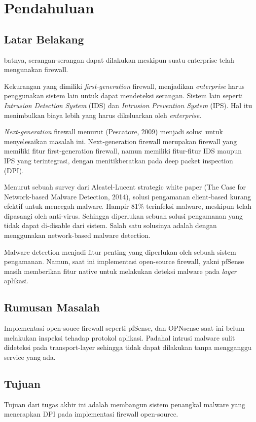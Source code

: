 \chapter{Pendahuluan}

\section{Latar Belakang}

batnya, serangan-serangan dapat dilakukan meskipun suatu enterprise telah mengunakan firewall.

Kekurangan yang dimiliki \textit{first-generation} firewall, menjadikan \textit{enterprise} harus penggunakan sistem lain untuk dapat mendeteksi serangan. Sistem lain seperti \textit{Intrusion Detection System} (IDS) dan \textit{Intrusion Prevention System} (IPS). Hal itu menimbulkan biaya lebih yang harus dikeluarkan oleh \textit{enterprise}.

\textit{Next-generation} firewall menurut (Pescatore, 2009) menjadi solusi untuk menyelesaikan masalah ini. Next-generation firewall merupakan firewall yang memiliki fitur first-generation firewall, namun memiliki fitur-fitur IDS maupun IPS yang terintegrasi, dengan menitikberatkan pada deep packet inspection (DPI).

Menurut sebuah survey dari Alcatel-Lucent strategic white paper (The Case for
Network-based Malware Detection, 2014), solusi pengamanan client-based kurang
efektif untuk mencegah malware. Hampir 81\% terinfeksi malware, meskipun telah
dipasangi oleh anti-virus. Sehingga diperlukan sebuah solusi pengamanan yang
tidak dapat di-disable dari sistem. Salah satu solusinya adalah dengan
menggunakan network-based malware detection.

Malware detection menjadi fitur penting yang diperlukan oleh sebuah sistem pengamanan. Namun, saat ini implementasi open-source firewall, yakni pfSense masih memberikan fitur native untuk melakukan deteksi malware pada \textit{layer} aplikasi.

\section{Rumusan Masalah}
Implementasi open-souce firewall seperti  pfSense, dan OPNsense saat ini
belum melakukan inspeksi tehadap protokol aplikasi.
Padahal intrusi malware sulit dideteksi pada transport-layer
sehingga tidak dapat dilakukan tanpa mengganggu service yang ada.

\section{Tujuan}
Tujuan dari tugas akhir ini adalah membangun sistem penangkal malware yang menerapkan DPI pada implementasi firewall open-source.

